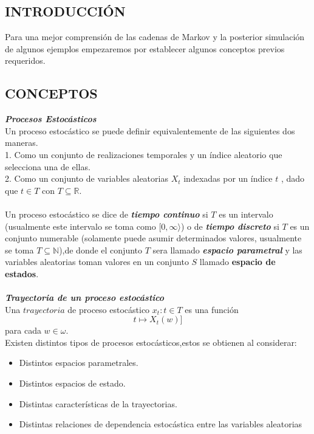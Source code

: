 \documentclass[10pt,a4paper]{article}
\theoremstyle{definition}
\theoremstyle{remark}
\begin{document}
\begin{multicols}{2}
\begin{center}
\section{INTRODUCCIÓN}
\end{center}
Para una mejor comprensión de las cadenas de Markov y la posterior simulación de algunos ejemplos empezaremos por establecer algunos conceptos previos requeridos.
\subsection{CONCEPTOS}
\textbf{\textit{Procesos Estocásticos}}\\
Un proceso estocástico se puede definir equivalentemente de las siguientes dos maneras.\\
1. Como un conjunto de realizaciones temporales y un índice aleatorio que selecciona una 
de ellas.\\
2. Como un conjunto de variables aleatorias $X_{t}$ indexadas por un índice $t$ , dado que $t \in T$ con $T\subseteq \mathbb{R} $.\\\\
Un proceso estocástico se dice de \textbf{\textit{tiempo continuo}} si $T$ es un intervalo (usualmente este intervalo se toma como $[0,\infty\rangle$) o de \textbf{\textit{tiempo discreto}} si $T$ es un conjunto numerable (solamente puede asumir determinados valores, usualmente se toma $T 
\subseteq \mathbb{N}$),de donde el conjunto $T$ sera llamado \textbf{\textit{espacio 
parametral}} y las variables aleatorias toman valores en un conjunto $S$ llamado 
\textbf{espacio de estados}.\\
\\
\textbf{\textit{Trayectoria de un proceso estocástico}}\\
Una $trayectoria$ de proceso estocástico $x_{t}: t \in T$ es una función $$t 
\longmapsto X_{t}(w)]$$ para cada $w \in \omega.$\\
Existen distintos tipos de procesos estocásticos,estos se obtienen al considerar:
\begin{itemize}
	\item Distintos espacios parametrales.
	\item Distintos espacios de estado.
	\item Distintas características de la trayectorias.
	\item Distintas relaciones de dependencia estocástica entre las variables aleatorias 

\end{itemize}
\end{multicols}
\end{document}

